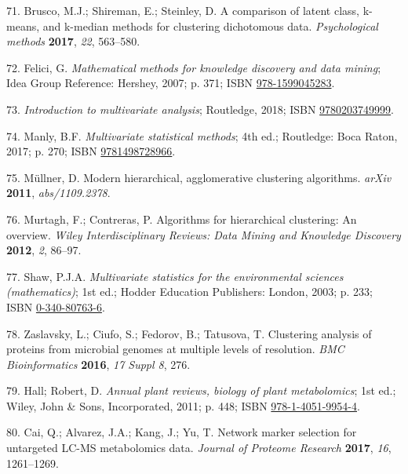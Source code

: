 \documentclass[]{article}
\begin{document}
\leavevmode\hypertarget{ref-brusco_2017}{}%
71. Brusco, M.J.; Shireman, E.; Steinley, D. A comparison of latent class, k-means, and k-median methods for clustering dichotomous data. \emph{Psychological methods} \textbf{2017}, \emph{22}, 563--580.

\leavevmode\hypertarget{ref-felici_2007}{}%
72. Felici, G. \emph{Mathematical methods for knowledge discovery and data mining}; Idea Group Reference: Hershey, 2007; p. 371; ISBN \href{https://worldcat.org/isbn/978-1599045283}{978-1599045283}.

\leavevmode\hypertarget{ref-Routledge_2018}{}%
73. \emph{Introduction to multivariate analysis}; Routledge, 2018; ISBN \href{https://worldcat.org/isbn/9780203749999}{9780203749999}.

\leavevmode\hypertarget{ref-manly_2017}{}%
74. Manly, B.F. \emph{Multivariate statistical methods}; 4th ed.; Routledge: Boca Raton, 2017; p. 270; ISBN \href{https://worldcat.org/isbn/9781498728966}{9781498728966}.

\leavevmode\hypertarget{ref-mllner_2011}{}%
75. Müllner, D. Modern hierarchical, agglomerative clustering algorithms. \emph{arXiv} \textbf{2011}, \emph{abs/1109.2378}.

\leavevmode\hypertarget{ref-murtagh_2012}{}%
76. Murtagh, F.; Contreras, P. Algorithms for hierarchical clustering: An overview. \emph{Wiley Interdisciplinary Reviews: Data Mining and Knowledge Discovery} \textbf{2012}, \emph{2}, 86--97.

\leavevmode\hypertarget{ref-shaw_2003}{}%
77. Shaw, P.J.A. \emph{Multivariate statistics for the environmental sciences (mathematics)}; 1st ed.; Hodder Education Publishers: London, 2003; p. 233; ISBN \href{https://worldcat.org/isbn/0-340-80763-6}{0-340-80763-6}.

\leavevmode\hypertarget{ref-zaslavsky_2016}{}%
78. Zaslavsky, L.; Ciufo, S.; Fedorov, B.; Tatusova, T. Clustering analysis of proteins from microbial genomes at multiple levels of resolution. \emph{BMC Bioinformatics} \textbf{2016}, \emph{17 Suppl 8}, 276.

\leavevmode\hypertarget{ref-hall_2011}{}%
79. Hall; Robert, D. \emph{Annual plant reviews, biology of plant metabolomics}; 1st ed.; Wiley, John \& Sons, Incorporated, 2011; p. 448; ISBN \href{https://worldcat.org/isbn/978-1-4051-9954-4}{978-1-4051-9954-4}.

\leavevmode\hypertarget{ref-cai_2017}{}%
80. Cai, Q.; Alvarez, J.A.; Kang, J.; Yu, T. Network marker selection for untargeted LC-MS metabolomics data. \emph{Journal of Proteome Research} \textbf{2017}, \emph{16}, 1261--1269.
\end{document}

